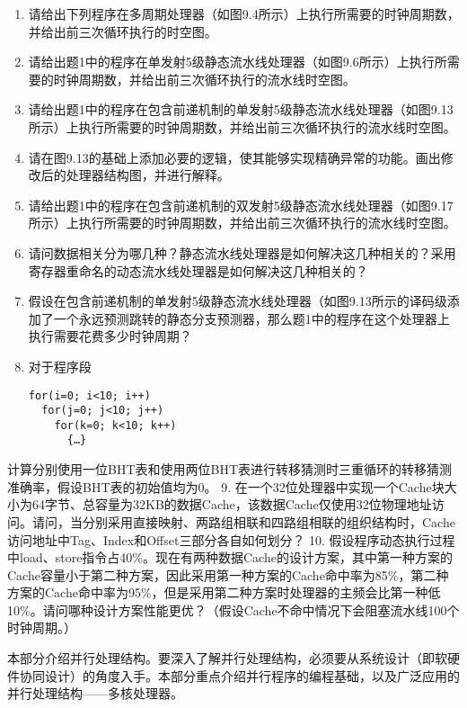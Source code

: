 \documentclass[]{ctexbook}
\begin{document}
\begin{enumerate}
\def\labelenumi{\arabic{enumi}.}
\item
  请给出下列程序在多周期处理器（如图9.4所示）上执行所需要的时钟周期数，并给出前三次循环执行的时空图。
\item
  请给出题1中的程序在单发射5级静态流水线处理器（如图9.6所示）上执行所需要的时钟周期数，并给出前三次循环执行的流水线时空图。
\item
  请给出题1中的程序在包含前递机制的单发射5级静态流水线处理器（如图9.13所示）上执行所需要的时钟周期数，并给出前三次循环执行的流水线时空图。
\item
  请在图9.13的基础上添加必要的逻辑，使其能够实现精确异常的功能。画出修改后的处理器结构图，并进行解释。
\item
  请给出题1中的程序在包含前递机制的双发射5级静态流水线处理器（如图9.17所示）上执行所需要的时钟周期数，并给出前三次循环执行的流水线时空图。
\item
  请问数据相关分为哪几种？静态流水线处理器是如何解决这几种相关的？采用寄存器重命名的动态流水线处理器是如何解决这几种相关的？
\item
  假设在包含前递机制的单发射5级静态流水线处理器（如图9.13所示的译码级添加了一个永远预测跳转的静态分支预测器，那么题1中的程序在这个处理器上执行需要花费多少时钟周期？
\item
  对于程序段

\begin{verbatim}
for(i=0; i<10; i++)
  for(j=0; j<10; j++)
    for(k=0; k<10; k++)
      {…}
\end{verbatim}
\end{enumerate}

计算分别使用一位BHT表和使用两位BHT表进行转移猜测时三重循环的转移猜测准确率，假设BHT表的初始值均为0。
9. 在一个32位处理器中实现一个Cache块大小为64字节、总容量为32KB的数据Cache，该数据Cache仅使用32位物理地址访问。请问，当分别采用直接映射、两路组相联和四路组相联的组织结构时，Cache访问地址中Tag、Index和Offset三部分各自如何划分？
10. 假设程序动态执行过程中load、store指令占40\%。现在有两种数据Cache的设计方案，其中第一种方案的Cache容量小于第二种方案，因此采用第一种方案的Cache命中率为85\%，第二种方案的Cache命中率为95\%，但是采用第二种方案时处理器的主频会比第一种低10\%。请问哪种设计方案性能更优？（假设Cache不命中情况下会阻塞流水线100个时钟周期。）

\newpage

本部分介绍并行处理结构。要深入了解并行处理结构，必须要从系统设计（即软硬件协同设计）的角度入手。本部分重点介绍并行程序的编程基础，以及广泛应用的并行处理结构------多核处理器。
\end{document}
